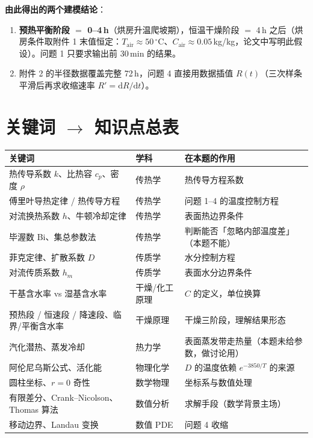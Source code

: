 \documentclass[12pt,a4paper]{ctexart}
\begin{document}
\textbf{由此得出的两个建模结论}：
\begin{enumerate}[leftmargin=2.5em]
\item \textbf{预热平衡阶段 $=$ 0--4\,h}（烘房升温爬坡期），恒温干燥阶段 $=$ 4\,h 之后（烘房条件取附件 1 末值恒定：$T_{\mathrm{air}}\approx50\,^\circ$C、$C_{\mathrm{air}}\approx0.05$\,kg/kg，论文中写明此假设）。问题 1 只要求输出前 30\,min 的结果。
\item 附件 2 的半径数据覆盖完整 72\,h，问题 4 直接用数据插值 $R(t)$（三次样条平滑后再求收缩速率 $R'=\mathrm{d}R/\mathrm{d}t$）。
\end{enumerate}

\section{关键词 $\to$ 知识点总表}

\begin{center}
\begin{tabular}{lll}
\toprule
关键词 & 学科 & 在本题的作用 \\
\midrule
热传导系数 $k$、比热容 $c_p$、密度 $\rho$ & 传热学 & 热传导方程系数 \\
傅里叶导热定律 / 热传导方程 & 传热学 & 问题 1--4 的温度控制方程 \\
对流换热系数 $h$、牛顿冷却定律 & 传热学 & 表面热边界条件 \\
毕渥数 Bi、集总参数法 & 传热学 & 判断能否「忽略内部温度差」（本题不能） \\
菲克定律、扩散系数 $D$ & 传质学 & 水分控制方程 \\
对流传质系数 $h_m$ & 传质学 & 表面水分边界条件 \\
干基含水率 vs 湿基含水率 & 干燥/化工原理 & $C$ 的定义，单位换算 \\
预热段 / 恒速段 / 降速段、临界/平衡含水率 & 干燥原理 & 干燥三阶段，理解结果形态 \\
汽化潜热、蒸发冷却 & 热力学 & 表面蒸发带走热量（本题未给参数，做讨论用） \\
阿伦尼乌斯公式、活化能 & 物理化学 & $D$ 的温度依赖 $e^{-3850/T}$ 的来源 \\
圆柱坐标、$r=0$ 奇性 & 数学物理 & 坐标系与数值处理 \\
有限差分、Crank--Nicolson、Thomas 算法 & 数值分析 & 求解手段（数学背景主场） \\
移动边界、Landau 变换 & 数值 PDE & 问题 4 收缩 \\
\bottomrule
\end{tabular}
\end{center}
\end{document}
